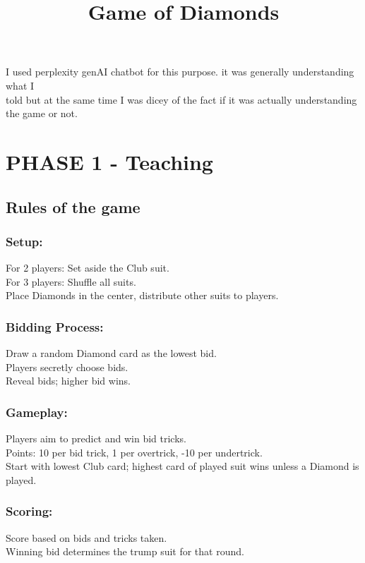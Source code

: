 \documentclass[12 pt]{report}
\begin{document}
\title{Game of Diamonds}
\maketitle
I used perplexity genAI chatbot for this purpose. it was generally understanding what I \\
told but at the same time I was dicey of the fact if it was actually understanding the game or not.\\

\chapter{PHASE 1 - Teaching}

\section{Rules of the game}
\subsection{Setup:} 
For 2 players: Set aside the Club suit. \\
For 3 players: Shuffle all suits. \\
Place Diamonds in the center, distribute other suits to players. \\
\subsection{Bidding Process:}
Draw a random Diamond card as the lowest bid. \\
Players secretly choose bids. \\
Reveal bids; higher bid wins. \\
\subsection{Gameplay:}
Players aim to predict and win bid tricks. \\
Points: 10 per bid trick, 1 per overtrick, -10 per undertrick. \\
Start with lowest Club card; highest card of played suit wins unless a Diamond is played. \\
\subsection{Scoring:}
Score based on bids and tricks taken. \\
Winning bid determines the trump suit for that round. \\
\end{document}
